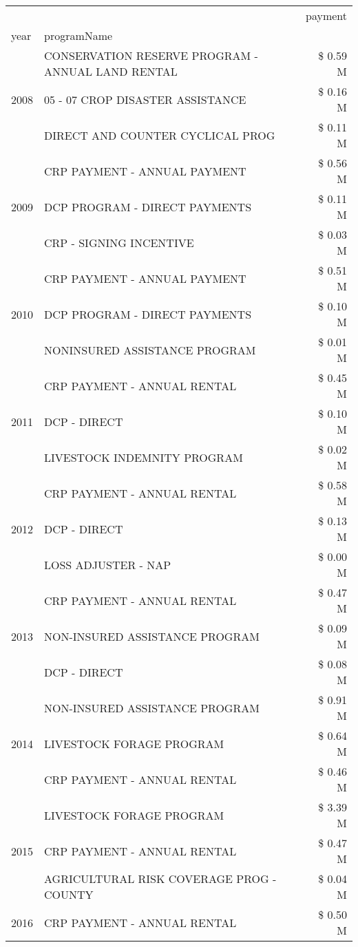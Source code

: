 \begin{tabular}{llr}
\toprule
 &  & payment \\
year & programName &  \\
\midrule
\multirow[t]{3}{*}{2008} & CONSERVATION RESERVE PROGRAM - ANNUAL LAND RENTAL & \$ 0.59 M \\
 & 05 - 07 CROP DISASTER ASSISTANCE & \$ 0.16 M \\
 & DIRECT AND COUNTER CYCLICAL PROG & \$ 0.11 M \\
\cline{1-3}
\multirow[t]{3}{*}{2009} & CRP PAYMENT - ANNUAL PAYMENT & \$ 0.56 M \\
 & DCP PROGRAM - DIRECT PAYMENTS & \$ 0.11 M \\
 & CRP - SIGNING INCENTIVE & \$ 0.03 M \\
\cline{1-3}
\multirow[t]{3}{*}{2010} & CRP PAYMENT - ANNUAL PAYMENT & \$ 0.51 M \\
 & DCP PROGRAM - DIRECT PAYMENTS & \$ 0.10 M \\
 & NONINSURED ASSISTANCE PROGRAM & \$ 0.01 M \\
\cline{1-3}
\multirow[t]{3}{*}{2011} & CRP PAYMENT - ANNUAL RENTAL & \$ 0.45 M \\
 & DCP - DIRECT & \$ 0.10 M \\
 & LIVESTOCK INDEMNITY PROGRAM & \$ 0.02 M \\
\cline{1-3}
\multirow[t]{3}{*}{2012} & CRP PAYMENT - ANNUAL RENTAL & \$ 0.58 M \\
 & DCP - DIRECT & \$ 0.13 M \\
 & LOSS ADJUSTER - NAP & \$ 0.00 M \\
\cline{1-3}
\multirow[t]{3}{*}{2013} & CRP PAYMENT - ANNUAL RENTAL & \$ 0.47 M \\
 & NON-INSURED ASSISTANCE PROGRAM & \$ 0.09 M \\
 & DCP - DIRECT & \$ 0.08 M \\
\cline{1-3}
\multirow[t]{3}{*}{2014} & NON-INSURED ASSISTANCE PROGRAM & \$ 0.91 M \\
 & LIVESTOCK FORAGE PROGRAM & \$ 0.64 M \\
 & CRP PAYMENT - ANNUAL RENTAL & \$ 0.46 M \\
\cline{1-3}
\multirow[t]{3}{*}{2015} & LIVESTOCK FORAGE PROGRAM & \$ 3.39 M \\
 & CRP PAYMENT - ANNUAL RENTAL & \$ 0.47 M \\
 & AGRICULTURAL RISK COVERAGE PROG - COUNTY & \$ 0.04 M \\
\cline{1-3}
\multirow[t]{3}{*}{2016} & CRP PAYMENT - ANNUAL RENTAL                   & \$ 0.50 M \\

\end{tabular}
